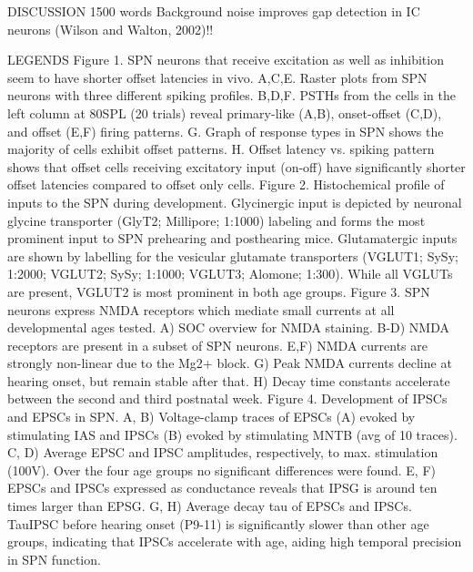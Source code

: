 \documentclass{article}
\begin{document}
DISCUSSION
1500 words
Background noise improves gap detection in IC neurons (Wilson and Walton, 2002)!!


LEGENDS
Figure 1. SPN neurons that receive excitation as well as inhibition seem to have shorter offset latencies in vivo. A,C,E. Raster plots from SPN neurons with three different spiking profiles. B,D,F. PSTHs from the cells in the left column at 80SPL (20 trials) reveal primary-like (A,B), onset-offset (C,D), and offset (E,F) firing patterns. G. Graph of response types in SPN shows the majority of cells exhibit offset patterns. H. Offset latency vs. spiking pattern shows that offset cells receiving excitatory input (on-off) have significantly shorter offset latencies compared to offset only cells.
Figure 2. Histochemical profile of inputs to the SPN during development. Glycinergic input is depicted by neuronal glycine transporter (GlyT2; Millipore; 1:1000) labeling and forms the most prominent input to SPN prehearing and posthearing mice. Glutamatergic inputs are shown by labelling for the vesicular glutamate transporters (VGLUT1; SySy; 1:2000; VGLUT2; SySy; 1:1000; VGLUT3; Alomone; 1:300).  While all VGLUTs are present, VGLUT2 is most prominent in both age groups.
Figure 3. SPN neurons express NMDA receptors which mediate small currents at all developmental ages tested. A) SOC overview for NMDA staining. B-D) NMDA receptors are present in a subset of SPN neurons. E,F) NMDA currents are strongly non-linear due to the Mg2+ block. G) Peak NMDA currents decline at hearing onset, but remain stable after that. H) Decay time constants accelerate between the second and third postnatal week.
Figure 4. Development of IPSCs and EPSCs  in SPN. A, B) Voltage-clamp traces of EPSCs (A) evoked by stimulating IAS and IPSCs (B) evoked by stimulating MNTB (avg of 10 traces). C, D) Average EPSC and IPSC amplitudes, respectively, to max. stimulation (100V). Over the four age groups no significant differences were found. E, F) EPSCs and IPSCs expressed as conductance reveals that IPSG is around ten times larger than EPSG. G, H) Average decay tau of EPSCs and IPSCs. TauIPSC before hearing onset (P9-11) is significantly slower than other age groups, indicating that IPSCs accelerate with age, aiding high temporal precision in SPN function. 
\end{document}
